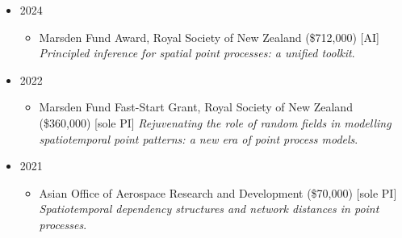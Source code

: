 \documentclass[10pt,a4paper]{moderncv}
\begin{document}
\vspace{6pt}
\begin{itemize}
  \item 2024
  \begin{itemize}
  \item Marsden Fund Award, Royal Society of New Zealand (\$712,000) [AI] \textit{Principled inference for spatial point processes: a unified toolkit}. 
  \end{itemize}
\item 2022
  \begin{itemize}
  \item Marsden Fund Fast-Start Grant, Royal Society of New Zealand (\$360,000) [sole PI] \textit{Rejuvenating the role of random fields in modelling spatiotemporal point patterns: a new era of point process models}.
  \end{itemize}
\item 2021
  \begin{itemize}
  \item Asian Office of Aerospace Research and Development (\$70,000) [sole PI] \textit{Spatiotemporal dependency structures and network distances in point processes}.
  \end{itemize}
\end{itemize}
\end{document}
